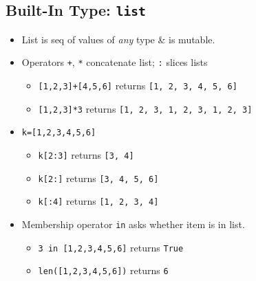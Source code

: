 \documentclass{article}
\begin{document}
\subsection{Built-In Type: \texttt{list}}
    \begin{multicols}{2}
        \begin{itemize}
            \item List is seq of values of \textit{any} type \& is mutable.
            \item Operators \texttt{+}, \texttt{*} concatenate list; \texttt{:} slices lists
                \begin{itemize}
                    \item \texttt{[1,2,3]+[4,5,6]} returns \texttt{[1, 2, 3, 4, 5, 6]}
                    \item \texttt{[1,2,3]*3} returns \texttt{[1, 2, 3, 1, 2, 3, 1, 2, 3]}
                \end{itemize}
            \item \texttt{k=[1,2,3,4,5,6]}
                \begin{itemize}
                    \item \texttt{k[2:3]} returns \texttt{[3, 4]}
                    \item \texttt{k[2:]} returns \texttt{[3, 4, 5, 6]}
                    \item \texttt{k[:4]} returns \texttt{[1, 2, 3, 4]}
                \end{itemize}
            \item Membership operator \texttt{in} asks whether item is in list.
                \begin{itemize}
                    \item \texttt{3 in [1,2,3,4,5,6]} returns \texttt{True}
                    \item \texttt{len([1,2,3,4,5,6])} returns \texttt{6}
                \end{itemize}
        \end{itemize}
    \end{multicols}

\end{document}

